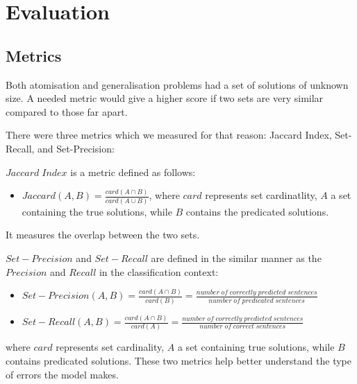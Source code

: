 \section{Evaluation}

\subsection{Metrics}



Both atomisation and generalisation problems had a set of solutions of unknown size.
A needed metric would give a higher score if two sets are very similar compared to those far apart.

There were three metrics which we measured for that reason: Jaccard Index, Set-Recall, and Set-Precision:

$Jaccard \; Index$ is a metric defined as follows:
\begin{itemize}
   \item $Jaccard(A, B) = \frac{card(A \cap B)}{card(A \cup B)}$, where $card$ represents set cardinatlity, $A$ a set containing the true solutions, while $B$ contains the predicated solutions.\\
\end{itemize}
It measures the overlap between the two sets.
 
$Set-Precision$ and $Set-Recall$ are defined in the similar manner as the $Precision$ and $Recall$ in the classification context:
\begin{itemize}
    \item $Set-Precision(A, B) = \frac{card(A \cap B)}{card(B)} = \frac{number \; of \; correctly \; predicted \; sentences}{number \; of \; predicated \; sentences}$
    \item $Set-Recall(A, B) = \frac{card(A \cap B)}{card(A)} = \frac{number \; of \; correctly \; predicted \; sentences}{number \; of \; correct \; sentences} $ 
\end{itemize}
where $card$ represents set cardinality, $A$ a set containing true solutions, while $B$ contains predicated solutions. 
These two metrics help better understand the type of errors the model makes.


% 
% 
% 
% 

